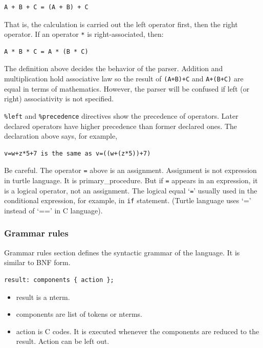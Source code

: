 \begin{lstlisting}
A + B + C = (A + B) + C
\end{lstlisting}

That is, the calculation is carried out the left operator first, then
the right operator. If an operator \passthrough{\lstinline!*!} is
right-associated, then:

\begin{lstlisting}
A * B * C = A * (B * C)
\end{lstlisting}

The definition above decides the behavior of the parser. Addition and
multiplication hold associative law so the result of
\passthrough{\lstinline!(A+B)+C!} and \passthrough{\lstinline!A+(B+C)!}
are equal in terms of mathematics. However, the parser will be confused
if left (or right) associativity is not specified.

\passthrough{\lstinline!\%left!} and
\passthrough{\lstinline!\%precedence!} directives show the precedence of
operators. Later declared operators have higher precedence than former
declared ones. The declaration above says, for example,

\begin{lstlisting}
v=w+z*5+7 is the same as v=((w+(z*5))+7)
\end{lstlisting}

Be careful. The operator \passthrough{\lstinline!=!} above is an
assignment. Assignment is not expression in turtle language. It is
primary\_procedure. But if \passthrough{\lstinline!=!} appears in an
expression, it is a logical operator, not an assignment. The logical
equal `\passthrough{\lstinline!=!}' usually used in the conditional
expression, for example, in \passthrough{\lstinline!if!} statement.
(Turtle language uses `=' instead of `==' in C language).

\subsubsection{Grammar rules}\label{grammar-rules}

Grammar rules section defines the syntactic grammar of the language. It
is similar to BNF form.

\begin{lstlisting}
result: components { action };
\end{lstlisting}

\begin{itemize}
\tightlist
\item
  result is a nterm.
\item
  components are list of tokens or nterms.
\item
  action is C codes. It is executed whenever the components are reduced
  to the result. Action can be left out.
\end{itemize}

